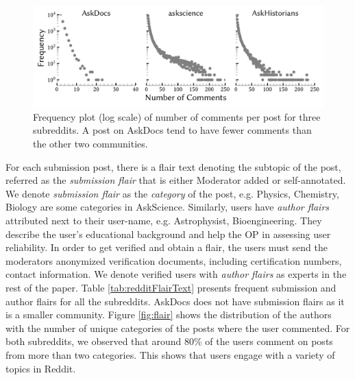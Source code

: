 \begin{figure}
  \centering
  \includegraphics[scale=0.62]{images/Frequency}
  \caption{Frequency plot (log scale) of number of comments per post for three subreddits. A post on AskDocs tend to have fewer comments than the other two communities.}
  \label{fig:frequency}
\end{figure}

For each submission post,
there is a flair text denoting the subtopic of the post, referred as the \textit{submission flair} that is either Moderator added or self-annotated. We denote \emph{submission flair} as the \emph{category} of the post, e.g. Physics, Chemistry, Biology are some categories in AskScience. Similarly, users have \textit{author flairs} attributed next to their user-name, e.g. Astrophysist, Bioengineering. They describe the user's educational background and help the OP in assessing user reliability. In order to get verified and obtain a flair, the users must send the moderators anonymized verification documents, including certification numbers, contact information. We denote verified users with \textit{author flairs} as experts in the rest of the paper.
Table \ref{tab:redditFlairText} presents frequent submission and author flairs for all the subreddits.
AskDocs does not have submission flairs as it is a smaller community.
Figure \ref{fig:flair} shows the distribution of the authors with the number of unique categories of the posts where the user commented. For both subreddits, we observed that around 80\% of the users comment on posts from more than two categories. This shows that users engage with a variety of topics in Reddit.


